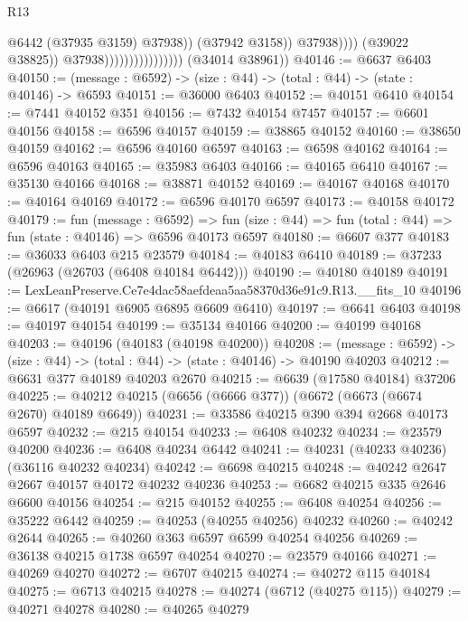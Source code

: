 \begin{lexlean}{R13}
\begin{coremodule}
                                                      @6442
                                                      (@37935 @3159)
                                                      @37938))
                                                  (@37942 @3158))
                                                @37938))))
                                        (@39022 @38825))
                                      @37938))))))))))))))))
      (@34014 @38961))
@40146 := @6637 @6403
@40150 := (message : @6592) -> (size : @44) -> (total : @44) -> (state : @40146) -> @6593
@40151 := @36000 @6403
@40152 := @40151 @6410
@40154 := @7441 @40152 @351
@40156 := @7432 @40154 @7457
@40157 := @6601 @40156
@40158 := @6596 @40157
@40159 := @38865 @40152
@40160 := @38650 @40159
@40162 := @6596 @40160 @6597
@40163 := @6598 @40162
@40164 := @6596 @40163
@40165 := @35983 @6403
@40166 := @40165 @6410
@40167 := @35130 @40166
@40168 := @38871 @40152
@40169 := @40167 @40168
@40170 := @40164 @40169
@40172 := @6596 @40170 @6597
@40173 := @40158 @40172
@40179 := fun (message : @6592) =>
  fun (size : @44) => fun (total : @44) => fun (state : @40146) => @6596 @40173 @6597
@40180 := @6607 @377
@40183 := @36033 @6403 @215 @23579
@40184 := @40183 @6410
@40189 := @37233 (@26963 (@26703 (@6408 @40184 @6442)))
@40190 := @40180 @40189
@40191 := LexLeanPreserve.Ce7e4dac58aefdeaa5aa58370d36e91c9.R13.__fits_10
@40196 := @6617 (@40191 @6905 @6895 @6609 @6410)
@40197 := @6641 @6403
@40198 := @40197 @40154
@40199 := @35134 @40166
@40200 := @40199 @40168
@40203 := @40196 (@40183 (@40198 @40200))
@40208 := (message : @6592) -> (size : @44) -> (total : @44) -> (state : @40146) -> @40190 @40203
@40212 := @6631 @377 @40189 @40203 @2670
@40215 := @6639 (@17580 @40184) @37206
@40225 := @40212 @40215 (@6656 (@6666 @377)) (@6672 (@6673 (@6674 @2670) @40189 @6649))
@40231 := @33586 @40215 @390 @394 @2668 @40173 @6597
@40232 := @215 @40154
@40233 := @6408 @40232
@40234 := @23579 @40200
@40236 := @6408 @40234 @6442
@40241 := @40231 (@40233 @40236) (@36116 @40232 @40234)
@40242 := @6698 @40215
@40248 := @40242 @2647 @2667 @40157 @40172 @40232 @40236
@40253 := @6682 @40215 @335 @2646 @6600 @40156
@40254 := @215 @40152
@40255 := @6408 @40254
@40256 := @35222 @6442
@40259 := @40253 (@40255 @40256) @40232
@40260 := @40242 @2644
@40265 := @40260 @363 @6597 @6599 @40254 @40256
@40269 := @36138 @40215 @1738 @6597 @40254
@40270 := @23579 @40166
@40271 := @40269 @40270
@40272 := @6707 @40215
@40274 := @40272 @115 @40184
@40275 := @6713 @40215
@40278 := @40274 (@6712 (@40275 @115))
@40279 := @40271 @40278
@40280 := @40265 @40279

\end{coremodule}
\end{lexlean}

